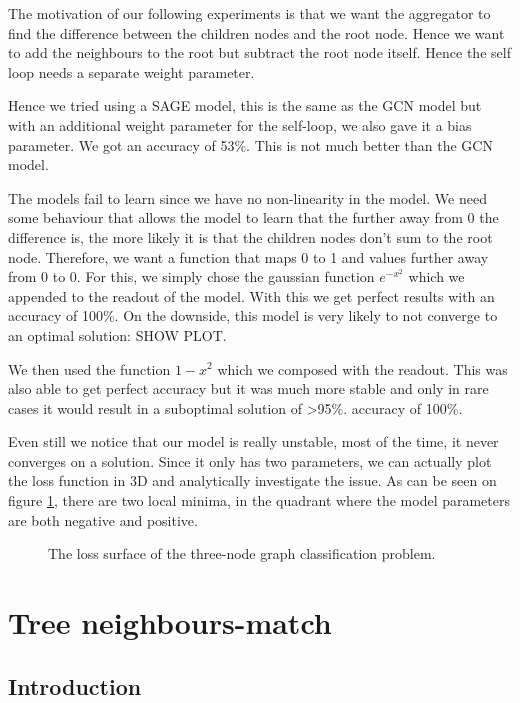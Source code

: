 \documentclass[a4paper,12pt]{article}
\begin{document}
The motivation of our following experiments is that we want the aggregator to find the difference between the children nodes and the root node. Hence we want to add the neighbours to the root but subtract the root node itself. Hence the self loop needs a separate weight parameter.

Hence we tried using a SAGE model, this is the same as the GCN model but with
an additional weight parameter for the self-loop, we also gave it a bias parameter. We got an accuracy of 53\%. %
This is not much better than the GCN model.

The models fail to learn since we have no non-linearity in the model. We need some behaviour
that allows the model to learn that the further away from 0 the difference is,
the more likely it is that the children nodes don't sum to the root node.
Therefore, we want a function that maps 0 to 1 and values further away from 0 to 0. 
For this, we simply chose the gaussian function \(e^{-x^2}\) which we
appended to the readout of the model. With this we get perfect results with an
accuracy of 100\%. On the downside, this model is very likely to not converge to an optimal solution: SHOW PLOT.

We then used the function \(1-x^{2}\) which we composed with the readout. This was also able to get perfect accuracy but it was much more stable and only in rare cases it would result in a suboptimal solution of >95\%.
accuracy of 100\%.

Even still we notice that our model is really unstable, most of the time, it never converges on a solution. Since it only has two parameters, we can actually plot the loss function in 3D and analytically investigate the issue. As can be seen on figure \ref{fig:loss_surface}, there are two local minima, in the quadrant where the model parameters are both negative and positive. 

\begin{figure}[H]
  \centering
  
  \caption{The loss surface of the three-node graph classification problem.}
  \label{fig:loss_surface}
\end{figure}




\section{Tree neighbours-match}
\subsection{Introduction}
\end{document}
